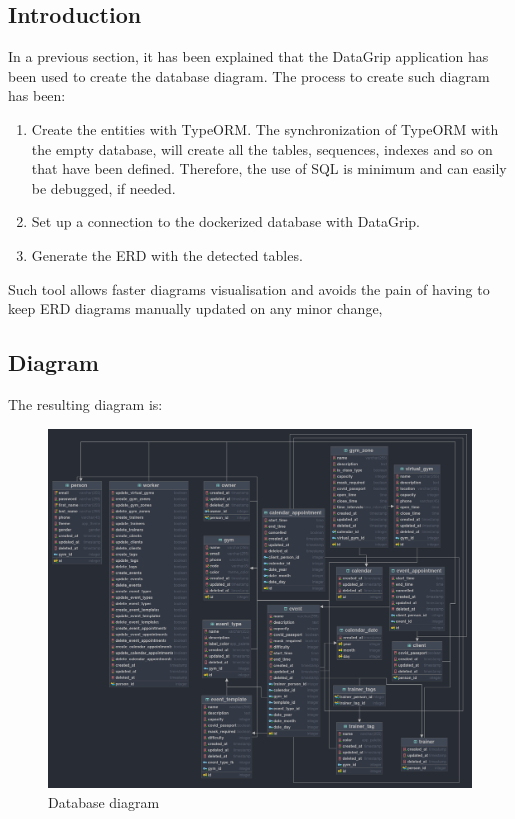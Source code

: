 \documentclass[a4paper, 12pt, oneside]{book}
\begin{document}
\subsection{Introduction}
In a previous section, it has been explained that the DataGrip application has been used to create the database diagram. The process to create such diagram has been:
\begin{enumerate}[label = \textbf{\arabic{*}.}]
	\item Create the entities with TypeORM. The synchronization of TypeORM with the empty database, will create all the tables, sequences, indexes and so on that have been defined. Therefore, the use of SQL is minimum and can easily be debugged, if needed.
	\item Set up a connection to the dockerized database with DataGrip.
	\item Generate the ERD with the detected tables.
\end{enumerate}
Such tool allows faster diagrams visualisation and avoids the pain of having to keep ERD diagrams manually updated on any minor change,
\subsection{Diagram}
The resulting diagram is:
\begin{figure}[H]
	\centering
	\includegraphics[width=\textwidth]{assets/db-erd.png}
	\caption{Database diagram}
\end{figure}
\end{document}
